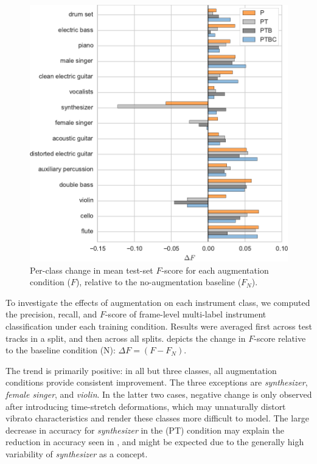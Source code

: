 \documentclass{article}
\begin{document}
\begin{figure}[t]
    \centering
    \includegraphics[width=\columnwidth]{figs/fscore-improvement}
    \caption{Per-class change in mean test-set $F$-score for each augmentation condition
        ($F$), relative to the no-augmentation baseline ($F_N$).\label{fscore}}
\end{figure}

To investigate the effects of augmentation on each instrument class,
we computed the precision, recall, and $F$-score of frame-level multi-label
instrument classification under each training condition.  Results were averaged first
across test tracks in a split, and then across all splits.
 depicts the change in $F$-score relative to the baseline
condition (N): $\Delta F = (F - F_N)$.

The trend is primarily positive: in all but three classes, all augmentation
conditions provide consistent improvement.  
The three exceptions are \emph{synthesizer}, \emph{female singer},
and \emph{violin}.
In the latter two cases, negative change is only observed after introducing time-stretch
deformations, which may unnaturally distort vibrato characteristics and
render these classes more difficult to model.
The large decrease in accuracy for \emph{synthesizer} in the (PT) condition may explain 
the reduction in accuracy seen in , and might be expected due to the
generally high variability of \emph{synthesizer} as a concept.
\end{document}
